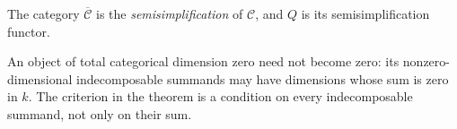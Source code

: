 \begin{definition}
The category $\overline{\mathcal C}$ is the
\emph{semisimplification} of $\mathcal C$, and $Q$ is its
semisimplification functor.
\end{definition}

An object of total categorical dimension zero need not become zero:
its nonzero-dimensional indecomposable summands may have dimensions
whose sum is zero in $k$. The criterion in the theorem is a condition
on every indecomposable summand, not only on their sum.
